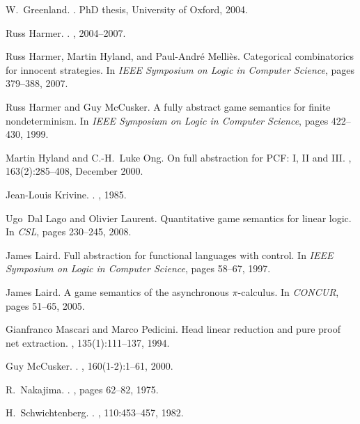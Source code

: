 \documentclass{article}
\begin{document}
\begin{thebibliography}{10}
W.~Greenland.
.
\newblock PhD thesis, {University of Oxford}, 2004.

Russ Harmer.
.
, 2004--2007.

Russ Harmer, Martin Hyland, and Paul-Andr{\'e} Melli{\`e}s.
\newblock Categorical combinatorics for innocent strategies.
\newblock In {\em IEEE Symposium on Logic in Computer Science}, pages 379--388,
  2007.

Russ Harmer and Guy McCusker.
\newblock A fully abstract game semantics for finite nondeterminism.
\newblock In {\em IEEE Symposium on Logic in Computer Science}, pages 422--430,
  1999.

Martin Hyland and C.-H.~Luke Ong.
\newblock On full abstraction for {PCF}: {I}, {II} and {III}.
, 163(2):285--408, December 2000.

Jean-Louis Krivine.
.
, 1985.

Ugo~Dal Lago and Olivier Laurent.
\newblock Quantitative game semantics for linear logic.
\newblock In {\em CSL}, pages 230--245, 2008.

James Laird.
\newblock Full abstraction for functional languages with control.
\newblock In {\em IEEE Symposium on Logic in Computer Science}, pages 58--67,
  1997.

James Laird.
\newblock A game semantics of the asynchronous $\pi$-calculus.
\newblock In {\em CONCUR}, pages 51--65, 2005.

Gianfranco Mascari and Marco Pedicini.
\newblock Head linear reduction and pure proof net extraction.
, 135(1):111--137, 1994.

Guy McCusker.
.
, 160(1-2):1--61, 2000.

R.~Nakajima.
.
, pages 62--82,
  1975.

H.~Schwichtenberg.
.
,
  110:453--457, 1982.

\end{thebibliography}
\end{document}
